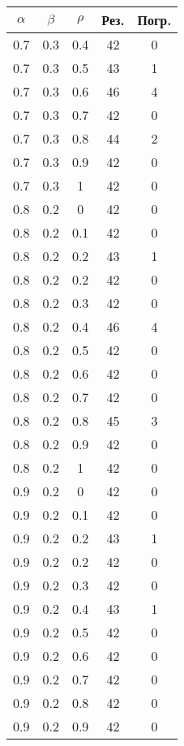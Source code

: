 \begin{table}[!h]
	\begin{center}
		\begin{tabular}{|c|c|c|c|c|}
			\hline
			$\alpha$        & $\beta$      & $\rho$      &Рез.  & Погр. \\
			\hline
			0.7  & 0.3  & 0.4  & 42  & 0   \\
			0.7  & 0.3  & 0.5  & 43  & 1   \\
			0.7  & 0.3  & 0.6  & 46  & 4     \\
			0.7  & 0.3  & 0.7  & 42  & 0     \\
			0.7  & 0.3  & 0.8  & 44  & 2     \\
			0.7  & 0.3  & 0.9  & 42  & 0     \\
			0.7  & 0.3  & 1    & 42  & 0     \\ \hline
			0.8  & 0.2  & 0    & 42  & 0   \\
			0.8  & 0.2  & 0.1  & 42  & 0   \\
			0.8  & 0.2  & 0.2  & 43  & 1     \\
			0.8  & 0.2  & 0.2  & 42  & 0     \\
			0.8  & 0.2  & 0.3  & 42  & 0    \\
			0.8  & 0.2  & 0.4  & 46  & 4   \\
			0.8  & 0.2  & 0.5  & 42  & 0  \\
			0.8  & 0.2  & 0.6  & 42  & 0   \\
			0.8  & 0.2  & 0.7  & 42  & 0   \\
			0.8  & 0.2  & 0.8  & 45  & 3   \\
			0.8  & 0.2  & 0.9  & 42  & 0   \\
			0.8  & 0.2  & 1    & 42  & 0     \\ \hline
			0.9  & 0.2  & 0    & 42  & 0   \\
			0.9  & 0.2  & 0.1  & 42  & 0   \\
			0.9  & 0.2  & 0.2  & 43  & 1    \\
			0.9  & 0.2  & 0.2  & 42  & 0     \\
			0.9  & 0.2  & 0.3  & 42  & 0     \\
			0.9  & 0.2  & 0.4  & 43  & 1   \\
			0.9  & 0.2  & 0.5  & 42  & 0   \\
			0.9  & 0.2  & 0.6  & 42  & 0   \\
			0.9  & 0.2  & 0.7  & 42  & 0   \\
			0.9  & 0.2  & 0.8  & 42  & 0   \\
			0.9  & 0.2  & 0.9  & 42  & 0   \\

\end{tabular}
\end{center}
\end{table}
